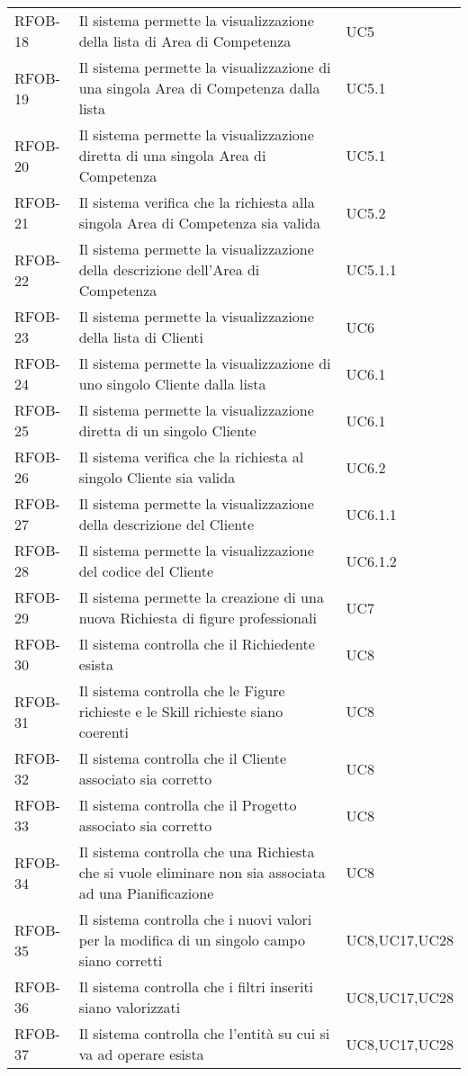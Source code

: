 \begin{center}
\begin{longtable}{p{2.0cm}|p{8cm}|p{2.7cm}}
RFOB-18  & Il sistema permette la visualizzazione della lista di Area di Competenza & UC5 \\ 
RFOB-19  & Il sistema permette la visualizzazione di una singola Area di Competenza dalla lista & UC5.1 \\ 
RFOB-20  & Il sistema permette la visualizzazione diretta di una singola Area di Competenza & UC5.1 \\ 
RFOB-21  & Il sistema verifica che la richiesta alla singola Area di Competenza sia valida & UC5.2 \\ 
RFOB-22  & Il sistema permette la visualizzazione della descrizione dell'Area di Competenza & UC5.1.1 \\ 
RFOB-23  & Il sistema permette la visualizzazione della lista di Clienti & UC6 \\ 
RFOB-24  & Il sistema permette la visualizzazione di uno singolo Cliente dalla lista & UC6.1 \\ 
RFOB-25  & Il sistema permette la visualizzazione diretta di un singolo Cliente & UC6.1 \\ 
RFOB-26  & Il sistema verifica che la richiesta al singolo Cliente sia valida & UC6.2 \\ 
RFOB-27  & Il sistema permette la visualizzazione della descrizione del Cliente & UC6.1.1\\ 
RFOB-28  & Il sistema permette la visualizzazione del codice del Cliente & UC6.1.2 \\ 

RFOB-29  & Il sistema permette la creazione di una nuova Richiesta di figure professionali & UC7 \\ 
RFOB-30  & Il sistema controlla che il Richiedente esista & UC8 \\ 
RFOB-31  & Il sistema controlla che le Figure richieste e le Skill richieste siano coerenti & UC8 \\ 
RFOB-32  & Il sistema controlla che il Cliente associato sia corretto & UC8 \\ 
RFOB-33  & Il sistema controlla che il Progetto associato sia corretto & UC8 \\ 
RFOB-34  & Il sistema controlla che una Richiesta che si vuole eliminare non sia associata ad una Pianificazione & UC8 \\ 
RFOB-35 & Il sistema controlla che i nuovi valori per la modifica di un singolo campo siano corretti & UC8,UC17,UC28\\
RFOB-36  & Il sistema controlla che i filtri inseriti siano valorizzati & UC8,UC17,UC28 \\ 
RFOB-37  & Il sistema controlla che l'entità su cui si va ad operare esista & UC8,UC17,UC28 \\ 



\end{longtable}
\end{center}
